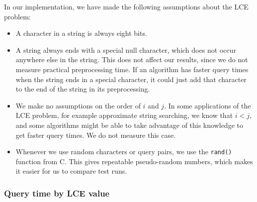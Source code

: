 \documentclass[a4]{article}
\begin{document}
In our implementation, we have made the following assumptions about the LCE problem:
\begin{itemize}
\item A character in a string is always eight bits.
\item A string always ends with a special null character, which does not occur anywhere else in the string. This does not affect our results, since we do not measure practical preprocessing time. If an algorithm has faster query times when the string ends in a special character, it could just add that character to the end of the string in its preprocessing.
\item We make no assumptions on the order of $i$ and $j$. In some applications of the LCE problem, for example approximate string searching, we know that $i<j$, and some algorithms might be able to take advantage of this knowledge to get faster query times. We do not measure this case.
\item Whenever we use random characters or query pairs, we use the \texttt{rand()} function from C. This gives repeatable pseudo-random numbers, which makes it easier for us to compare test runs.
\end{itemize}


\subsubsection{Query time by LCE value}
\end{document}
